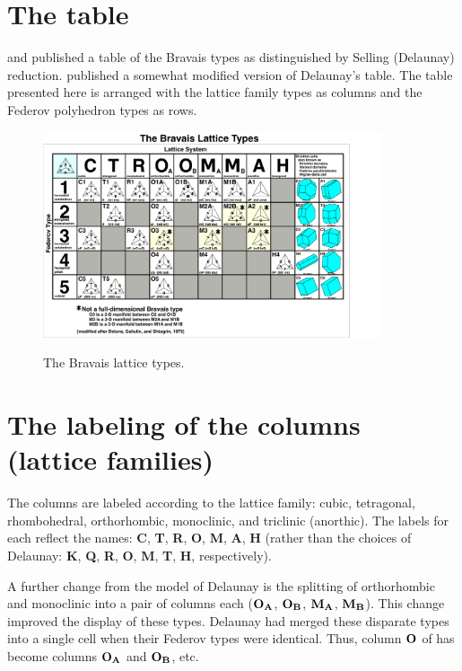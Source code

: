 \documentclass[preprint]{iucr}              %
\numberwithin{equation}{section}
\begin{document}
		
	
\section{The table}

	 and  published a table of the Bravais types
	as distinguished by Selling (Delaunay) reduction.\cite{andrews2023measuring} published
	a somewhat modified version of Delaunay's table. The table presented here
	is arranged with the lattice family types as columns and the Federov polyhedron
	types as rows.
			\begin{figure}
		\includegraphics[width=10cm]{HorizontalDeloneGrid}
		\label{grid}
		\caption{The  Bravais lattice types.}
	\end{figure}
	
\section{The labeling of the columns (lattice families)}
	
	The columns are labeled according to the lattice family: cubic,
	tetragonal, rhombohedral, orthorhombic, monoclinic, and
	triclinic (anorthic). The labels for each reflect the names:
	\textbf{C}, \textbf{T}, \textbf{R}, \textbf{O},\textbf{ M}, \textbf{A}, \textbf{H} (rather than the choices of Delaunay: \textbf{K}, \textbf{Q},
	\textbf{R},\textbf{ O},\textbf{ M}, \textbf{T}, \textbf{H}, respectively).
	
	A further change from the model of Delaunay is the splitting 
	of orthorhombic and monoclinic into a pair of columns each
	($\bf{O_A}$, $\bf{O_B}$, $\bf{M_A}$, $\bf{M_B}$). This change 
	improved the display of these types. Delaunay had merged these
	disparate types into a single cell when their Federov
	types were identical. Thus, column $\bf{O}$ of 
	has become columns $\bf{O_A}$ and $\bf{O_B}$, etc.
		
\end{document}
